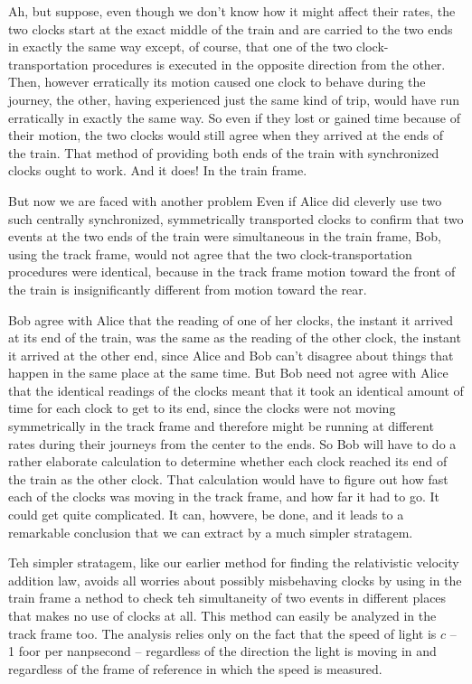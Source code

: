 Ah, but suppose, even though we don't know how it might affect their rates, the two clocks start at the exact middle of the train and are carried to the two ends in exactly the same way except, of course, that one of the two clock-transportation procedures is executed in the opposite direction from the other. Then, however erratically its motion caused one clock to behave during the journey, the other, having experienced just the same kind of trip, would have run erratically in exactly the same way. So even if they lost or gained time because of their motion, the two clocks would still agree when they arrived at the ends of the train. That method of providing both ends of the train with synchronized clocks ought to work. And it does! In the train frame.

But now we are faced with another problem Even if Alice did cleverly use two such centrally synchronized, symmetrically transported clocks to confirm that two events at the two ends of the train were simultaneous in the train frame, Bob, using the track frame, would not agree that the two clock-transportation procedures were identical, because in the track frame motion toward the front of the train is  insignificantly different from motion toward the rear.

Bob  agree with Alice that the reading of one of her clocks, the instant it arrived at its end of the train, was the same as the reading of the other clock, the instant it arrived at the other end, since Alice and Bob can't disagree about things that happen  in the same place  at the same time. But Bob need not agree with Alice that the identical readings of the clocks meant that it took an identical amount of time for each clock to get to its end, since the clocks were not moving symmetrically in the track frame and therefore might be running at different rates during their journeys from the center to the ends. So Bob will have to do a rather elaborate calculation to determine whether each clock reached its end of the train  as the other clock. That calculation would have to figure out how fast each of the clocks was moving in the track frame, and how far it had to go. It could get quite complicated. It can, howvere, be done, and it leads to a remarkable conclusion that we can extract by a much simpler stratagem.

Teh simpler stratagem, like our earlier method for finding the relativistic velocity addition law, avoids all worries about possibly misbehaving clocks by using in the train frame a nethod to check teh simultaneity of two events in different places that makes no use of clocks at all. This method can easily be analyzed in the track frame too. The analysis relies only on the fact that the speed of light is $c$ -- 1 foor per nanpsecond -- regardless of the direction the light is moving in and regardless of the frame of reference in which the speed is measured.

